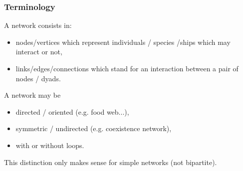 \documentclass[compress,10pt]{beamer}
\begin{document}
\begin{frame} \frametitle{Terminology}
 
 A network consists in:
 \begin{itemize}
  \item nodes/vertices which represent individuals / species /ships which may interact or not,
  \item links/edges/connections which stand for an interaction between a pair of nodes / dyads.
  
 \end{itemize}

\bigskip
 
 A network may be 
 \begin{itemize}
  \item directed / oriented (e.g. food web...),
  \item symmetric / undirected (e.g. coexistence network),
  \item with or without loops.
 \end{itemize}

This distinction only makes sense for simple networks (not bipartite).
 
 
\end{frame}
\end{document}
